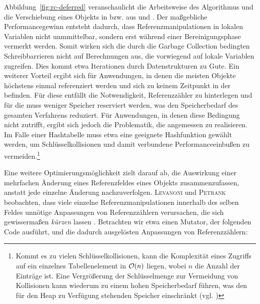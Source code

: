 Abbildung~\ref{fig:rc-deferred} veranschaulicht die Arbeitsweise des Algorithmus und die Verschiebung eines Objekts  in bzw. aus  und .
Der maßgebliche Performancegewinn entsteht dadurch, dass Referenzmanipulationen in lokalen Variablen nicht unmmittelbar, sondern erst während einer Bereinigungsphase vermerkt werden.
Somit wirken sich die durch die Garbage Collection bedingten Schreibbarrieren nicht auf Berechnungen aus, die vorwiegend auf lokale Variablen zugreifen.
Dies kommt etwa Iterationen durch Datenstrukturen zu Gute.
Ein weiterer Vorteil ergibt sich für Anwendungen, in denen die meisten Objekte höchstens einmal referenziert werden und sich zu keinem Zeitpunkt in der  befinden.
Für diese entfällt die Notwendigkeit, Referenzzähler zu hinterlegen und für die  muss weniger Speicher reserviert werden, was den Speicherbedarf des gesamten Verfahrens reduziert.
Für Anwendungen, in denen diese Bedingung nicht zutrifft, ergibt sich jedoch die Problematik, die  angemessen zu realisieren.
Im Falle einer Hashtabelle muss etwa eine geeignete Hashfunktion gewählt werden, um Schlüsselkollisionen und damit verbundene Performanceeinbußen zu vermeiden.\footnote{Kommt es zu vielen Schlüsselkollisionen, kann die Komplexität eines Zugriffs auf ein einzelnes Tabellenelement in $\mathcal{O}(n)$ liegen, wobei $n$ die Anzahl der Einträge ist. Eine Vergrößerung der Schlüsselmenge zur Vermeidung von Kollisionen kann wiederum zu einem hohen Speicherbedarf führen, was den für den Heap zu Verfügung stehenden Speicher einschränkt (vgl. \cite[S. 253]{cormen-leiserson})}

Eine weitere Optimierungsmöglichkeit zielt darauf ab, die Auswirkung einer mehrfachen Änderung eines Referenzfeldes eines Objekts zusammenzufassen, anstatt jede einzelne Änderung nachzuverfolgen.
\textsc{Levanoni} und \textsc{Petrank} beobachten, dass viele einzelne Referenzmanipulationen innerhalb des selben Feldes unnötige Anpassungen von Referenzzählern verursachen, die sich gewissermaßen \textit{kürzen} lassen \cite[S. 4ff]{levanoni2006}.
Betrachten wir etwa einen Mutator, der folgenden Code ausführt, und die dadurch ausgelösten Anpassungen von Referenzzählern:

